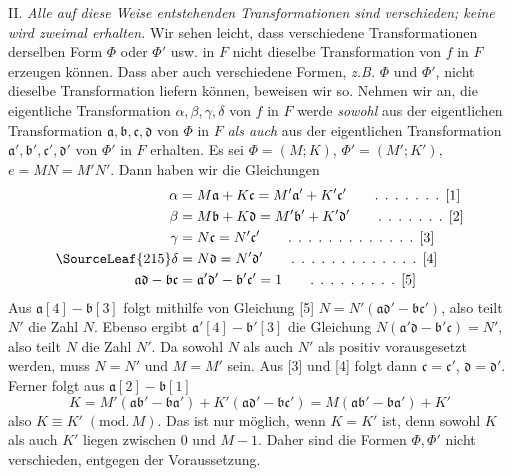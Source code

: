 II. \textit{Alle auf diese Weise entstehenden Transformationen sind verschieden; keine wird zweimal erhalten.} Wir sehen leicht, dass verschiedene Transformationen derselben Form $\Phi$ oder $\Phi'$ usw. in $F$ nicht dieselbe Transformation von $f$ in $F$ erzeugen können. Dass aber auch verschiedene Formen, \textit{z.B.} $\Phi$ und $\Phi'$, nicht dieselbe Transformation liefern können, beweisen wir so. Nehmen wir an, die eigentliche Transformation $\alpha,\beta,\gamma,\delta$ von $f$ in $F$ werde \textit{sowohl} aus der eigentlichen Transformation $\mathfrak{a},\mathfrak{b},\mathfrak{c},\mathfrak{d}$ von $\Phi$ in $F$ \textit{als auch} aus der eigentlichen Transformation $\mathfrak{a}',\mathfrak{b}',\mathfrak{c}',\mathfrak{d}'$ von $\Phi'$ in $F$ erhalten. Es sei $\Phi=(M;K)$, $\Phi'=(M';K')$, $e=MN=M'N'$. Dann haben wir die Gleichungen
\begin{align*}
\alpha&=M\mathfrak{a}+K\mathfrak{c}=M'\mathfrak{a}'+K'\mathfrak{c}' \tag*{. . . . . . . [1]}\\
\beta&=M\mathfrak{b}+K\mathfrak{d}=M'\mathfrak{b}'+K'\mathfrak{d}' \tag*{. . . . . . . [2]}\\
\gamma&=N\mathfrak{c}=N'\mathfrak{c}' \tag*{. . . . . . . . . . . . . [3]}
\\
\SourceLeaf{215}\delta&=N\mathfrak{d}=N'\mathfrak{d}' \tag*{. . . . . . . . . . . . . [4]}\\
\mathfrak{a}\mathfrak{d}-\mathfrak{b}\mathfrak{c}&=\mathfrak{a}'\mathfrak{d}'-\mathfrak{b}'\mathfrak{c}'=1 \tag*{. . . . . . . . . [5]}
\end{align*}
Aus $\mathfrak{a}[4]-\mathfrak{b}[3]$ folgt mithilfe von Gleichung [5] $N=N'(\mathfrak{a}\mathfrak{d}'-\mathfrak{b}\mathfrak{c}')$, also teilt $N'$ die Zahl $N$. Ebenso ergibt $\mathfrak{a}'[4]-\mathfrak{b}'[3]$ die Gleichung $N(\mathfrak{a}'\mathfrak{d}-\mathfrak{b}'\mathfrak{c})=N'$, also teilt $N$ die Zahl $N'$. Da sowohl $N$ als auch $N'$ als positiv vorausgesetzt werden, muss $N=N'$ und $M=M'$ sein. Aus [3] und [4] folgt dann $\mathfrak{c}=\mathfrak{c}'$, $\mathfrak{d}=\mathfrak{d}'$. Ferner folgt aus $\mathfrak{a}[2]-\mathfrak{b}[1]$
\[
K=M'(\mathfrak{a}\mathfrak{b}'-\mathfrak{b}\mathfrak{a}')+K'(\mathfrak{a}\mathfrak{d}'-\mathfrak{b}\mathfrak{c}')=M(\mathfrak{a}\mathfrak{b}'-\mathfrak{b}\mathfrak{a}')+K'
\]
also $K\equiv K'\;(\mathrm{mod.}\,M)$. Das ist nur möglich, wenn $K=K'$ ist, denn sowohl $K$ als auch $K'$ liegen zwischen 0 und $M-1$. Daher sind die Formen $\Phi,\Phi'$ nicht verschieden, entgegen der Voraussetzung.

